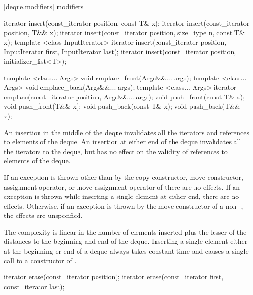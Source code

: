 [deque.modifiers]{ modifiers}

%
%
%
%
\begin{itemdecl}
iterator insert(const_iterator position, const T& x);
iterator insert(const_iterator position, T&& x);
iterator insert(const_iterator position, size_type n, const T& x);
template <class InputIterator>
  iterator insert(const_iterator position,
                  InputIterator first, InputIterator last);
iterator insert(const_iterator position, initializer_list<T>);

template <class... Args> void emplace_front(Args&&... args);
template <class... Args> void emplace_back(Args&&... args);
template <class... Args> iterator emplace(const_iterator position, Args&&... args);
void push_front(const T& x);
void push_front(T&& x);
void push_back(const T& x);
void push_back(T&& x);
\end{itemdecl}

\begin{itemdescr}
\pnum
\effects
An insertion in the middle of the deque invalidates all the iterators and
references to elements of the deque.
An insertion at either end of the
deque invalidates all the iterators to the deque, but has no effect on
the validity of references to elements of the deque.

\pnum
\notes
If an exception is thrown other than by the
copy constructor, move constructor,
assignment operator, or move assignment operator of
there are no effects.
If an exception is thrown while inserting a single element at either end,
there are no effects.
Otherwise, if an exception is thrown by the move constructor of a
non-
, the effects are unspecified.

\pnum
\complexity
The complexity is linear in the number of elements inserted plus the lesser
of the distances to the beginning and end of the deque.
Inserting a single element either at the beginning or end of a deque always takes constant time
and causes a single call to a constructor of
.
\end{itemdescr}

%
\begin{itemdecl}
iterator erase(const_iterator position);
iterator erase(const_iterator first, const_iterator last);
\end{itemdecl}

